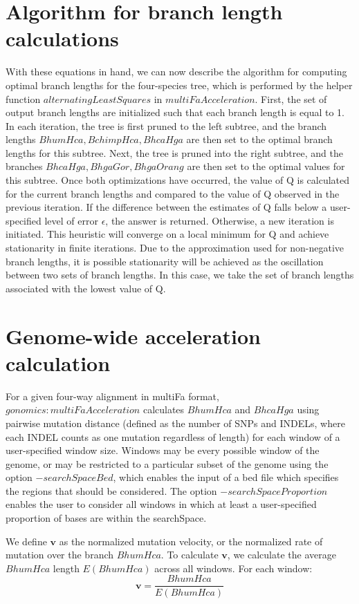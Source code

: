 \documentclass{article} %
\begin{document}
\section{Algorithm for branch length calculations}
With these equations in hand, we can now describe the algorithm for computing optimal branch lengths for the four-species tree, which is performed by the helper function $alternatingLeastSquares$ in $multiFaAcceleration$. First, the set of output branch lengths are initialized such that each branch length is equal to 1. In each iteration, the tree is first pruned to the left subtree, and the branch lengths $BhumHca, BchimpHca, BhcaHga$ are then set to the optimal branch lengths for this subtree. Next, the tree is pruned into the right subtree, and the branches $BhcaHga, BhgaGor, BhgaOrang$ are then set to the optimal values for this subtree. Once both optimizations have occurred, the value of Q is calculated for the current branch lengths and compared to the value of Q observed in the previous iteration. If the difference between the estimates of Q falls below a user-specified level of error $\epsilon$, the answer is returned. Otherwise, a new iteration is initiated. This heuristic will converge on a local minimum for Q and achieve stationarity in finite iterations. Due to the approximation used for non-negative branch lengths, it is possible stationarity will be achieved as the oscillation between two sets of branch lengths. In this case, we take the set of branch lengths associated with the lowest value of Q.
\section{Genome-wide acceleration calculation}
For a given four-way alignment in multiFa format, $gonomics:multiFaAcceleration$ calculates $BhumHca$ and $BhcaHga$ using pairwise mutation distance (defined as the number of SNPs and INDELs, where each INDEL counts as one mutation regardless of length) for each window of a user-specified window size. Windows may be every possible window of the genome, or may be restricted to a particular subset of the genome using the option $-searchSpaceBed$, which enables the input of a bed file which specifies the regions that should be considered. The option $-searchSpaceProportion$ enables the user to consider all windows in which at least a user-specified proportion of bases are within the searchSpace.

We define $\textbf{v}$ as the normalized mutation velocity, or the normalized rate of mutation over the branch $BhumHca$. To calculate $\textbf{v}$, we calculate the average $BhumHca$ length $E(BhumHca)$ across all windows. For each window:
\begin{equation*}
	\textbf{v} = \frac{BhumHca}{E(BhumHca)}
\end{equation*}
\end{document}
